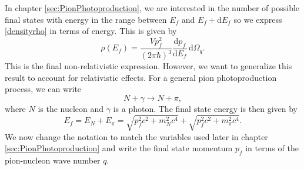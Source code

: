 In chapter \ref{sec:PionPhotoproduction}, we are interested in the number of possible final states with energy in the range between $E_f$ and $E_f + \text{d}E_f$ so we express \eqref{densityrho} in terms of energy. This is given by
\begin{equation} \label{densityenergy}
	\rho(E_f) = \frac{V p_f^2}{(2\pi \hbar)^3} \frac{\text{d}p_f}{\text{d}E_f} \, \text{d}\Omega_q.
\end{equation}
This is the final non-relativistic expression. However, we want to generalize this result to account for relativistic effects. For a general pion photoproduction process, we can write
\begin{equation} \label{twobody}
	N + \gamma \rightarrow N+\pi,
\end{equation}
where $N$ is the nucleon and $\gamma$ is a photon. The final state energy \cite{Kernebog} is then given by
\begin{equation} \label{Ef}
	E_f = E_N + E_\pi = \sqrt{p_f^2 c^2 +m_N^2c^4} + \sqrt{p_f^2c^2 + m^2_\pi c^4}.
\end{equation}
We now change the notation to match the variables used later in chapter \ref{sec:PionPhotoproduction} and write the final state momentum $p_f$ in terms of the pion-nucleon wave number $q$. 


